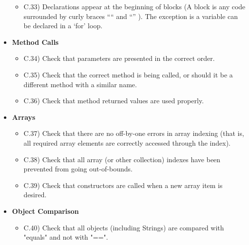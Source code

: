 \documentclass[../../codeInspection.tex]{subfiles}
\begin{document}
\begin{itemize}
\begin{itemize}
							\item C.33)\label{C:33} Declarations appear at the beginning of blocks (A block is any code surrounded by curly braces “{“ and “}” ). The exception is a variable can be declared in a ‘for’ loop.

						\end{itemize}

				\item 	\textbf{Method Calls}
						\begin{itemize}

							\item C.34)\label{C:34} Check that parameters are presented in the correct order.

							\item C.35)\label{C:35} Check that the correct method is being called, or should it be a different method with a similar name.

							\item C.36)\label{C:36} Check that method returned values are used properly.

						\end{itemize}

				\item 	\textbf{Arrays}
						\begin{itemize}

							\item C.37)\label{C:37} Check that there are no off-by-one errors in array indexing (that is, all required array elements are correctly accessed through the index).

							\item C.38)\label{C:38} Check that all array (or other collection) indexes have been prevented from going out-of-bounds.

							\item C.39)\label{C:39} Check that constructors are called when a new array item is desired.

						\end{itemize}

				\item 	\textbf{Object Comparison}
						\begin{itemize}

							\item C.40)\label{C:40} Check that all objects (including Strings) are compared with "equals" and not with "==".

						\end{itemize}


\end{itemize}
\end{document}
